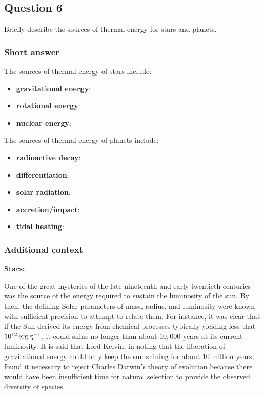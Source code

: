\documentclass[a4paper,10pt]{article}
\begin{document}

\newpage
\subsection{Question 6}

Briefly describe the sources of thermal energy for stars and planets.

\subsubsection{Short answer}

The sources of thermal energy of stars include:

\begin{itemize}
    \item \textbf{gravitational energy}:
    \item \textbf{rotational energy}: 
    \item \textbf{nuclear energy}:
\end{itemize}

{\noindent}The sources of thermal energy of planets include:

\begin{itemize}
    \item \textbf{radioactive decay}:
    \item \textbf{differentiation}: 
    \item \textbf{solar radiation}:
    \item \textbf{accretion/impact}:
    \item \textbf{tidal heating}:
\end{itemize}

\subsubsection{Additional context}

{\noindent}\textbf{Stars:}

{\noindent}One of the great mysteries of the late nineteenth and early twentieth centuries was the source of the energy required to sustain the luminosity of the sun. By then, the defining Solar parameters of mass, radius, and luminosity were known with sufficient precision to attempt to relate them. For instance, it was clear that if the Sun derived its energy from chemical processes typically yielding less that $10^{12}\,{\rm erg\,g^{-1}}$, it could shine no longer than about $10,000$ years at its current luminosity. It is said that Lord Kelvin, in noting that the liberation of gravitational energy could only keep the sun shining for about $10$ million years, found it necessary to reject Charles Darwin's theory of evolution because there would have been insufficient time for natural selection to provide the observed diversity of species.
\end{document}
